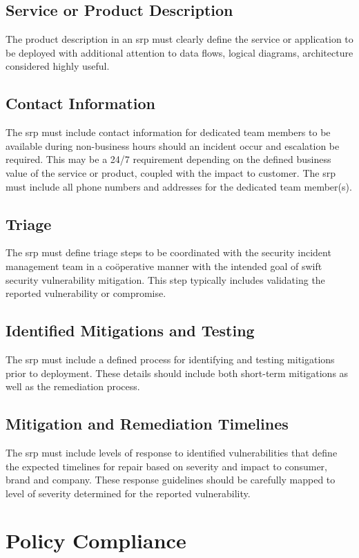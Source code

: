 \subsection{Service or Product Description}
The product description in an \gls{srp} must clearly define the service or application to be deployed with additional attention to data flows, logical diagrams,  architecture considered highly useful.
\subsection{Contact Information}
The \gls{srp} must include contact information for dedicated team members to be available during non-business hours should an incident occur and escalation be required.  
This may be a 24/7 requirement depending on the defined business value of the service or product, coupled with the impact to customer.  
The \gls{srp} must include all phone numbers and \email{} addresses for the dedicated team member(s).
\subsection{Triage}
The \gls{srp} must define triage steps to be coordinated with the security incident management team in a co\"{o}perative manner with the intended goal of swift security vulnerability mitigation.  
This step typically includes validating the reported vulnerability or compromise.
\subsection{Identified Mitigations and Testing}
The \gls{srp} must include a defined process for identifying and testing mitigations prior to deployment.  
These details should include both short-term mitigations as well as the remediation process.
\subsection{Mitigation and Remediation Timelines}
The \gls{srp} must include levels of response to identified vulnerabilities that define the expected timelines for repair based on severity and impact to consumer, brand\oxford{} and company.  
These response guidelines should be carefully mapped to level of severity determined for the reported vulnerability.
\section{Policy Compliance}
